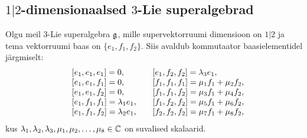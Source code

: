 
\subsection{\texorpdfstring{$1|2$}{1|2}-dimensionaalsed
    \texorpdfstring{$3$}{3}-Lie superalgebrad}

Olgu meil $3$-Lie superalgebra $\mathfrak{g}$, mille supervektorruumi dimensioon
on $1|2$ ja tema vektorruumi baas on $\{ e_1, f_1, f_2 \}$. Siis avaldub
kommutaator baasielementidel järgmiselt:
\begin{align*}
    \begin{matrix*}[l]
        & [e_1, e_1, e_1] = 0, \quad
        & [e_1, f_2, f_2] = \l_3 e_1, \\
        & [e_1, e_1, f_1] = 0, \quad
        & [f_1, f_1, f_1] = \m_1 f_1 + \m_2 f_2, \\
        & [e_1, e_1, f_2] = 0, \quad
        & [f_1, f_1, f_2] = \m_3 f_1 + \m_4 f_2, \\
        & [e_1, f_1, f_1] = \l_1 e_1, \quad
        & [f_1, f_2, f_2] = \m_5 f_1 + \m_6 f_2, \\
        & [e_1, f_1, f_2] = \l_2 e_1, \quad
        & [f_2, f_2, f_2] = \m_7 f_1 + \m_8 f_2,
    \end{matrix*}
\end{align*}
kus $\lambda_1, \lambda_2, \lambda_3, \mu_1, \mu_2, \dots, \mu_8 \in \mathbb{C}$ on suvalised skalaarid.


